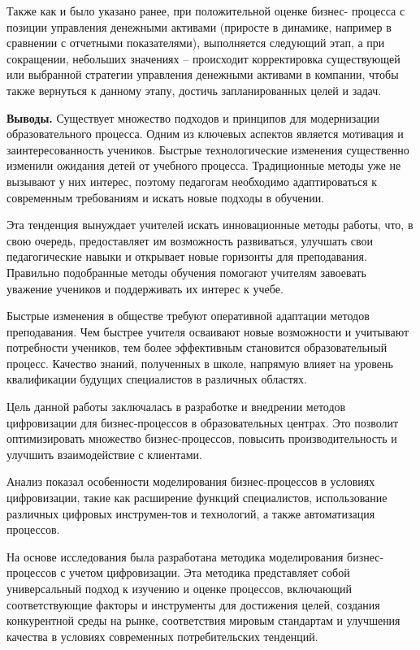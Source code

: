 \begin{multicols}{2}

Также как и было указано ранее, при положительной оценке бизнес-
процесса с позиции управления денежными активами (приросте в динамике,
например в сравнении с отчетными показателями), выполняется следующий
этап, а при сокращении, небольших значениях -- происходит корректировка
существующей или выбранной стратегии управления денежными активами в
компании, чтобы также вернуться к данному этапу, достичь запланированных
целей и задач.

{\bfseries Выводы.} Существует множество подходов и принципов для
модернизации образовательного процесса. Одним из ключевых аспектов
является мотивация и заинтересованность учеников. Быстрые
технологические изменения существенно изменили ожидания детей от
учебного процесса. Традиционные методы уже не вызывают у них интерес,
поэтому педагогам необходимо адаптироваться к современным требованиям и
искать новые подходы в обучении.

Эта тенденция вынуждает учителей искать инновационные методы работы,
что, в свою очередь, предоставляет им возможность развиваться, улучшать
свои педагогические навыки и открывает новые горизонты для преподавания.
Правильно подобранные методы обучения помогают учителям завоевать
уважение учеников и поддерживать их интерес к учебе.

Быстрые изменения в обществе требуют оперативной адаптации методов
преподавания. Чем быстрее учителя осваивают новые возможности и
учитывают потребности учеников, тем более эффективным становится
образовательный процесс. Качество знаний, полученных в школе, напрямую
влияет на уровень квалификации будущих специалистов в различных
областях.

Цель данной работы заключалась в разработке и внедрении методов
цифровизации для бизнес-процессов в образовательных центрах. Это
позволит оптимизировать множество бизнес-процессов, повысить
производительность и улучшить взаимодействие с клиентами.

Анализ показал особенности моделирования бизнес-процессов в условиях
цифровизации, такие как расширение функций специалистов, использование
различных цифровых инструмен-тов и технологий, а также автоматизация
процессов.

На основе исследования была разработана методика моделирования
бизнес-процессов с учетом цифровизации. Эта методика представляет собой
универсальный подход к изучению и оценке процессов, включающий
соответствующие факторы и инструменты для достижения целей, создания
конкурентной среды на рынке, соответствия мировым стандартам и улучшения
качества в условиях современных потребительских тенденций.

\end{multicols}

